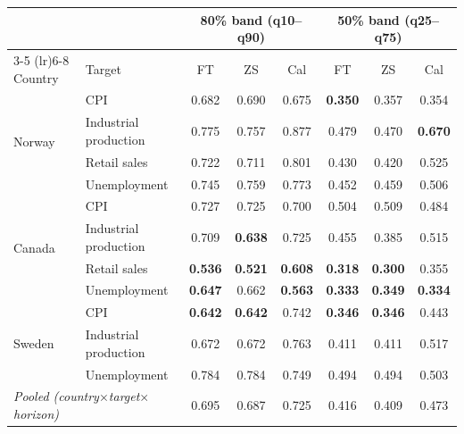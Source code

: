 \begin{tabular}{llcccccc}
\toprule
 & & \multicolumn{3}{c}{80\% band (q10--q90)} & \multicolumn{3}{c}{50\% band (q25--q75)} \\
\cmidrule(lr){3-5} \cmidrule(lr){6-8}
Country & Target & FT & ZS & Cal & FT & ZS & Cal \\
\midrule
\multirow{4}{*}{Norway} & CPI & 0.682 & 0.690 & 0.675 & \textbf{0.350} & 0.357 & 0.354 \\
 & Industrial production & 0.775 & 0.757 & 0.877 & 0.479 & 0.470 & \textbf{0.670} \\
 & Retail sales & 0.722 & 0.711 & 0.801 & 0.430 & 0.420 & 0.525 \\
 & Unemployment & 0.745 & 0.759 & 0.773 & 0.452 & 0.459 & 0.506 \\
\midrule
\multirow{4}{*}{Canada} & CPI & 0.727 & 0.725 & 0.700 & 0.504 & 0.509 & 0.484 \\
 & Industrial production & 0.709 & \textbf{0.638} & 0.725 & 0.455 & 0.385 & 0.515 \\
 & Retail sales & \textbf{0.536} & \textbf{0.521} & \textbf{0.608} & \textbf{0.318} & \textbf{0.300} & 0.355 \\
 & Unemployment & \textbf{0.647} & 0.662 & \textbf{0.563} & \textbf{0.333} & \textbf{0.349} & \textbf{0.334} \\
\midrule
\multirow{3}{*}{Sweden} & CPI & \textbf{0.642} & \textbf{0.642} & 0.742 & \textbf{0.346} & \textbf{0.346} & 0.443 \\
 & Industrial production & 0.672 & 0.672 & 0.763 & 0.411 & 0.411 & 0.517 \\
 & Unemployment & 0.784 & 0.784 & 0.749 & 0.494 & 0.494 & 0.503 \\
\midrule
\multicolumn{2}{l}{\emph{Pooled (country$\times$target$\times$horizon)}} & 0.695 & 0.687 & 0.725 & 0.416 & 0.409 & 0.473 \\
\bottomrule
\end{tabular}
